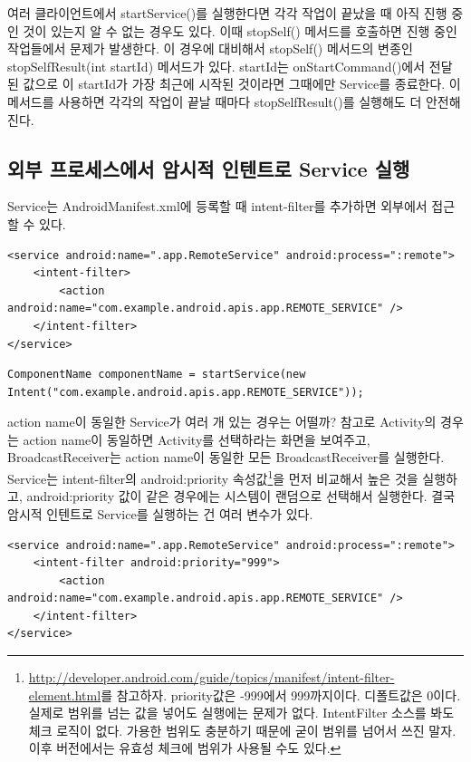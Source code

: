 여러 클라이언트에서 startService()를 실행한다면 각각 작업이 끝났을 때 아직 진행 중인 것이 있는지 알 수 없는 경우도 있다. 
이때 stopSelf() 메서드를 호출하면 진행 중인 작업들에서 문제가 발생한다. 
이 경우에 대비해서 stopSelf() 메서드의 변종인 stopSelfResult(int startId) 메서드가 있다.  startId는 onStartCommand()에서 전달된 값으로 이 startId가 가장 최근에 시작된 것이라면 그때에만 Service를 종료한다. 
이 메서드를 사용하면 각각의 작업이 끝날 때마다 stopSelfResult()를 실행해도 더 안전해진다.

\subsection{외부 프로세스에서 암시적 인텐트로 Service 실행}
Service는 AndroidManifest.xml에 등록할 때 intent-filter를 추가하면 외부에서 접근할 수 있다. 
\begin{lstlisting}[frame=single]
<service android:name=".app.RemoteService" android:process=":remote">
	<intent-filter>
		<action android:name="com.example.android.apis.app.REMOTE_SERVICE" />
	</intent-filter>
</service>
\end{lstlisting}

\begin{lstlisting}[frame=single]
ComponentName componentName = startService(new Intent("com.example.android.apis.app.REMOTE_SERVICE"));
\end{lstlisting}
action name이 동일한 Service가 여러 개 있는 경우는 어떨까? 참고로 Activity의 경우는 action name이 동일하면 Activity를 선택하라는 화면을 보여주고, BroadcastReceiver는 action name이 동일한 모든 BroadcastReceiver를 실행한다.
Service는 intent-filter의 android:priority 속성값\footnote{\url{http://developer.android.com/guide/topics/manifest/intent-filter-element.html}를 참고하자. priority값은 -999에서 999까지이다. 디폴트값은 0이다. 실제로 범위를 넘는 값을 넣어도 실행에는 문제가 없다. IntentFilter 소스를 봐도 체크 로직이 없다. 가용한 범위도 충분하기 때문에 굳이 범위를 넘어서 쓰진 말자. 이후 버전에서는 유효성 체크에 범위가 사용될 수도 있다.}을 먼저 비교해서 높은 것을 실행하고, android:priority 값이 같은 경우에는 시스템이 랜덤으로 선택해서 실행한다.
결국 암시적 인텐트로 Service를 실행하는 건 여러 변수가 있다.

\begin{lstlisting}[frame=single]
<service android:name=".app.RemoteService" android:process=":remote">
	<intent-filter android:priority="999">
		<action android:name="com.example.android.apis.app.REMOTE_SERVICE" />
	</intent-filter>
</service>
\end{lstlisting}

